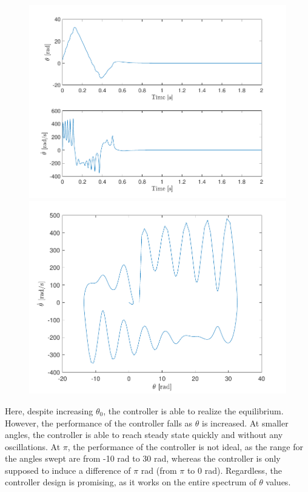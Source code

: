 \documentclass[10pt]{article}
\begin{document}
\begin{figure}[ht]
    \centering
    \begin{minipage}[b]{0.45\textwidth}
        \centering
        \includegraphics[clip,width=1\linewidth]{lab1/figs/section7_controlled_state_evolution_x_0_5.pdf}
    \end{minipage}
    \begin{minipage}[b]{0.45\textwidth}
        \centering
        \includegraphics[clip,width=1\linewidth]{lab1/figs/section7_controlled_state_orbit_x_0_5.pdf}
    \end{minipage}
\end{figure}

Here, despite increasing $\theta_0$, the controller is able to realize the equilibrium. However, the performance of the controller falls as $\theta$ is increased. At smaller angles, the controller is able to reach steady state quickly and without any oscillations. At $\pi$, the performance of the controller is not ideal, as the range for the angles swept are from -10 rad to 30 rad, whereas the controller is only supposed to induce a difference of $\pi$ rad (from $\pi$ to 0 rad). Regardless, the controller design is promising, as it works on the entire spectrum of $\theta$ values. 
\end{document}
